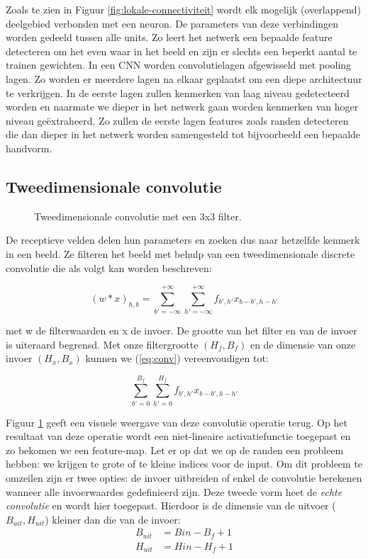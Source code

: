 \npar Zoals te zien in Figuur \ref{fig:lokale-connectiviteit} wordt elk mogelijk (overlappend) deelgebied verbonden met een neuron. De parameters van deze verbindingen worden gedeeld tussen alle units. Zo leert het netwerk een bepaalde feature detecteren om het even waar in het beeld en zijn er slechts een beperkt aantal te trainen gewichten.
\npar In een CNN worden convolutielagen afgewisseld met pooling lagen. Zo worden er meerdere lagen na elkaar geplaatst om een diepe architectuur te verkrijgen. In de eerste lagen zullen kenmerken van laag niveau gedetecteerd worden en naarmate we dieper in het netwerk gaan worden kenmerken van hoger niveau ge\"extraheerd. Zo zullen de eerste lagen features zoals randen detecteren die dan dieper in het netwerk worden samengesteld tot bijvoorbeeld een bepaalde handvorm.
 
\subsection{Tweedimensionale convolutie}
\begin{figure}[t!]
	\centering
	\def\svgwidth{0.55\columnwidth}
	
	\caption{Tweedimensionale convolutie met een 3x3 filter.}
	\label{fig:conv}
\end{figure}
De receptieve velden delen hun parameters en zoeken dus naar hetzelfde kenmerk in een beeld. Ze filteren het beeld met behulp van een tweedimensionale discrete convolutie die als volgt kan worden beschreven:

\begin{equation}\label{eq:conv}
(w * x)_{h,b} = \sum_{b'=-\infty}^{+\infty}\sum_{h'=-\infty}^{+\infty} f_{b',h'}x_{b-b',h-h'}
\end{equation}

\npar met w de filterwaarden en x de invoer. De grootte van het filter en van de invoer is uiteraard begrensd. Met onze filtergrootte $(H_f,B_f)$ en de dimensie van onze invoer $(H_x,B_x)$ kunnen we (\ref{eq:conv}) vereenvoudigen tot:

\begin{equation}
\sum_{b'=0}^{B_f}\sum_{h'=0}^{H_f} f_{b',h'}x_{b-b',h-h'}
\end{equation}

\npar Figuur \ref{fig:conv} geeft een visuele weergave van deze convolutie operatie terug. Op het resultaat van deze operatie wordt een niet-lineaire activatiefunctie toegepast en zo bekomen we een feature-map. Let er op dat we op de randen een probleem hebben: we krijgen te grote of te kleine indices voor de input. Om dit probleem te omzeilen zijn er twee opties: de invoer uitbreiden of enkel de convolutie berekenen wanneer alle invoerwaardes gedefinieerd zijn. Deze tweede vorm heet de \textit{echte convolutie} en wordt hier toegepast. Hierdoor is de dimensie van de uitvoer ($B_{uit},H_{uit}$) kleiner dan die van de invoer:
\begin{equation}
\begin{aligned}
B_{uit}&=B{in}-B_f+1 \\
H_{uit}&=H{in}-H_f+1
\end{aligned}
\end{equation}

